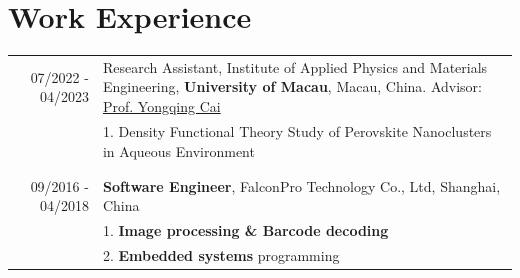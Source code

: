 \documentclass[a4paper,10pt]{article} %
\begin{document}

\section{Work Experience}
\begin{tabular}{r|p{11cm}}
	07/2022 - 04/2023            & Research Assistant,  Institute of Applied Physics and Materials Engineering, \textbf{University of Macau}, Macau, China. Advisor: \href{https://www.researchgate.net/profile/Yongqing-Cai-2} {Prof. Yongqing Cai}  \\
	& 1. Density Functional Theory Study of  Perovskite Nanoclusters in Aqueous Environment \\
	\multicolumn{2}{c}{} \\	%
	\multicolumn{2}{c}{} \\	%
	09/2016 - 04/2018            & \textbf{Software Engineer}, FalconPro Technology Co., Ltd, Shanghai, China \\                          & 1. \textbf{Image processing \& Barcode decoding}\\
								& 2. \textbf{Embedded systems} programming\\
\end{tabular}
\end{document}
